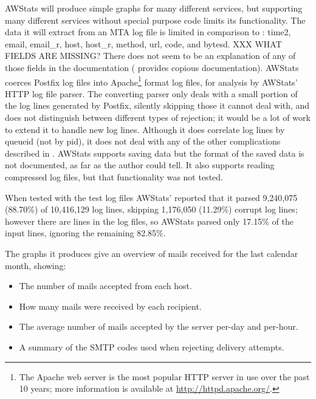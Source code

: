 AWStats will produce simple graphs for many different services, but
supporting many different services without special purpose code limits its
functionality.  The data it will extract from an \gls{MTA} log file is
limited in comparison to \parsername{}: \newline{} \tab{} time2, email,
email\_r, host, host\_r, method, url, code, and bytesd.\newline{} XXX WHAT
FIELDS ARE MISSING\@?  There does not seem to be an explanation of any of
those fields in the documentation (\parsername{} provides copious
documentation).  AWStats coerces Postfix log files into Apache\footnote{The
Apache web server is the most popular HTTP server in use over the past 10
years; more information is available at \url{http://httpd.apache.org/}.}
format log files, for analysis by AWStats' HTTP log file parser.  The
converting parser only deals with a small portion of the log lines
generated by Postfix, silently skipping those it cannot deal with, and does
not distinguish between different types of rejection; it would be a lot of
work to extend it to handle new log lines.  Although it does correlate log
lines by queueid (not by pid), it does not deal with any of the other
complications described in .  AWStats supports
saving data but the format of the saved data is not documented, as far as
the author could tell.  It also supports reading compressed log files, but
that functionality was not tested.

When tested with the \numberOFlogFILES{} test log files AWStats' reported
that it parsed 9,240,075 (88.70\%) of 10,416,129 log lines, skipping
1,176,050 (11.29\%) corrupt log lines; however there are
\numberOFlogLINES{} lines in the \numberOFlogFILES{} log files, so AWStats
parsed only 17.15\% of the input lines, ignoring the remaining 82.85\%.

The graphs it produces give an overview of mails received for the last
calendar month, showing:

\begin{itemize}

    \item The number of mails accepted from each host.

    \item How many mails were received by each recipient.

    \item The average number of mails accepted by the server per-day and
        per-hour.

    \item A summary of the \gls{SMTP} codes used when rejecting delivery
        attempts.

\end{itemize}

